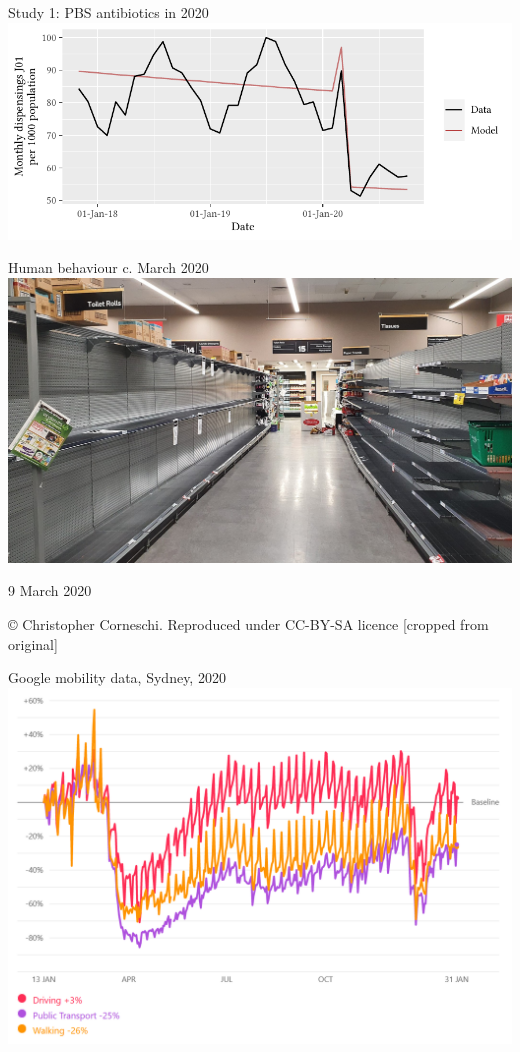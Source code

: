 \documentclass[aspectratio=169,12pt]{beamer} %
\begin{document}
\begin{frame}{Study 1: PBS antibiotics in 2020}
\centering
\includegraphics{ref/latex-j01armap3-1.pdf}
\end{frame}

\begin{frame}{Human behaviour c. March 2020}
\centering
\includegraphics[height=0.75\textheight]
	{ref/toilet-paper-crop.jpg}

	\tiny 9 March 2020

	\copyright\: Christopher Corneschi.
	Reproduced under CC-BY-SA licence [cropped from original]
\end{frame}

\begin{frame}{Google mobility data, Sydney, 2020}
\centering
\includegraphics[height=0.8\textheight]
        {ref/google-mobility-20210202.PNG}
\end{frame}
\end{document}
